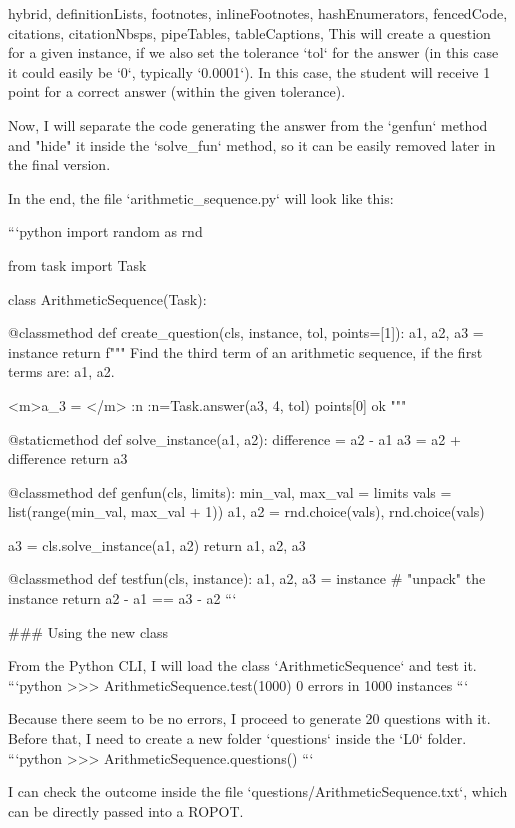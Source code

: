 \documentclass[
  digital, %
  table,   %
  twoside, %
  nolof,     %
  nolot,     %
  draft=false,
  final,
]{fithesis3}
\begin{document}
\begin{markdown*}{%
  hybrid,
  definitionLists,
  footnotes,
  inlineFootnotes,
  hashEnumerators,
  fencedCode,
  citations,
  citationNbsps,
  pipeTables,
  tableCaptions,
}
This will create a question for a given instance, if we also set the
tolerance `tol` for the answer (in this case it could easily be `0`, typically `0.0001`).
In this case, the student will receive 1 point for a correct answer (within the given tolerance).

Now, I will separate the code generating the answer from the `genfun` method and
"hide" it inside the `solve_fun` method, so it can be easily removed later in the final version.

In the end, the file `arithmetic_sequence.py` will look like this:

```python
import random as rnd

from task import Task

class ArithmeticSequence(Task):

    @classmethod
    def create_question(cls, instance, tol, points=[1]):
        a1, a2, a3 = instance
        return f"""
        Find the third term of an arithmetic sequence, if the first terms 
        are: {a1}, {a2}. 
        
        <m>a_3 = </m> :n
        :n={Task.answer(a3, 4, tol)} {points[0]} ok
        """
    
    @staticmethod
    def solve_instance(a1, a2):
        difference = a2 - a1
        a3 = a2 + difference
        return a3
    
    @classmethod
    def genfun(cls, limits):
        min_val, max_val = limits
        vals = list(range(min_val, max_val + 1))
        a1, a2 = rnd.choice(vals), rnd.choice(vals)
    
        a3 = cls.solve_instance(a1, a2)
        return a1, a2, a3
    
    @classmethod
    def testfun(cls, instance):
        a1, a2, a3 = instance  # "unpack" the instance
        return a2 - a1 == a3 - a2
```

### Using the new class

From the Python CLI, I will load the class `ArithmeticSequence` and test it.
```python
>>> ArithmeticSequence.test(1000)
0 errors in 1000 instances
```

Because there seem to be no errors, I proceed to generate 20 questions with it.
Before that, I need to create a new folder `questions` inside the `L0` folder.
```python
>>> ArithmeticSequence.questions()
```

I can check the outcome inside the file `questions/ArithmeticSequence.txt`, which
can be directly passed into a ROPOT.

\end{markdown*}
\shorthandon{-}
\end{document}
